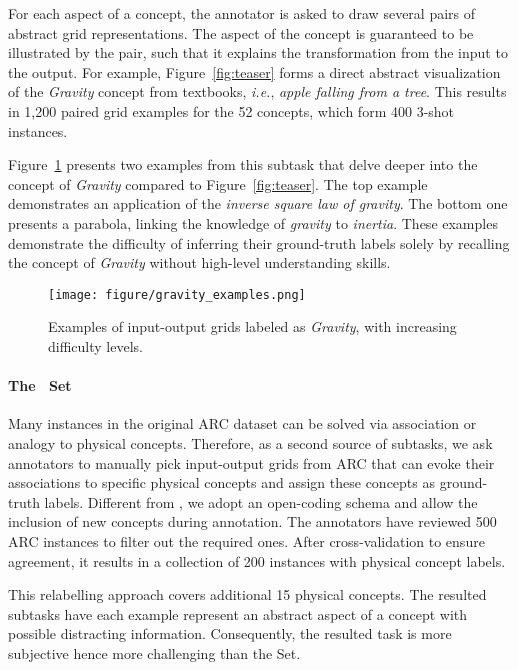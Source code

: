 For each aspect of a concept, the annotator is asked to draw several pairs of abstract grid representations. The aspect of the concept is guaranteed to be illustrated by the pair, such that it explains the transformation from the input to the output. For example, Figure~\ref{fig:teaser} forms a direct abstract visualization of the \emph{Gravity} concept from textbooks, \emph{i.e.}, \emph{apple falling from a tree}.
This results in 1,200 paired grid examples for the 52 concepts, which form 400 3-shot instances.


Figure~\ref{fig:level_examples} presents two examples from this subtask that delve deeper into the concept of \emph{Gravity}
compared to Figure~\ref{fig:teaser}.
The top example demonstrates an application of the \emph{inverse square law of gravity}.
The bottom one presents a parabola, linking the knowledge of \emph{gravity} to \emph{inertia}.
These examples demonstrate the difficulty of inferring their ground-truth labels solely by recalling the concept of \emph{Gravity} without high-level understanding skills.

\begin{figure}[t!]
\centering
\texttt{[image: figure/gravity\_examples.png]}
\vspace{-0.1in}
\caption{Examples of input-output grids labeled as \emph{Gravity}, with increasing difficulty levels.}
\label{fig:level_examples}
\vspace{-0.25in}
\end{figure}

\paragraph{The \harddatasetns\ Set}
Many instances in the original ARC dataset can be solved via association or analogy to physical concepts.
Therefore, as a second source of subtasks, we ask annotators to manually pick input-output grids from ARC that can evoke their associations to specific physical concepts and assign these concepts as ground-truth labels.
Different from \coredatasetns, we adopt an open-coding schema and allow the inclusion of new concepts during annotation.
The annotators have reviewed 500 ARC instances to filter out the required ones.
After cross-validation to ensure agreement, it results in a collection of 200 instances with physical concept labels.

This relabelling approach covers additional 15 physical concepts.
The resulted subtasks have each example represent an abstract aspect of a concept with possible distracting information. Consequently, the resulted task is more subjective hence more challenging than the \emph{\coredatasetns}Set.



